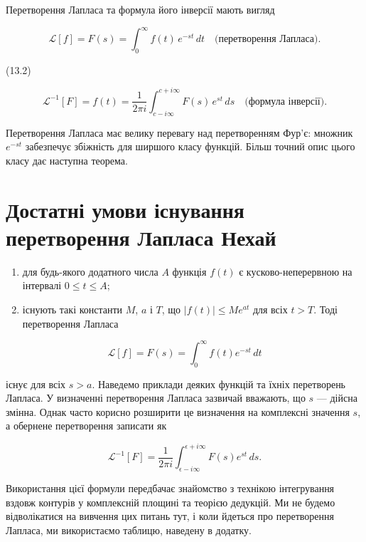 \documentclass[
  ukrainian,
]{article}
\providecommand{\tightlist}{%
  \setlength{\itemsep}{0pt}\setlength{\parskip}{0pt}}
\begin{document}
Перетворення Лапласа та формула його інверсії мають вигляд

\[
\mathscr{L}[f] = F(s) = \int_{0}^{\infty} f(t) \, e^{-st} \, dt
\quad \text{(перетворення Лапласа).}
\]

(13.2)

\[
\mathscr{L}^{-1}[F] = f(t) = \frac{1}{2\pi i} \int_{c-i\infty}^{c+i\infty} F(s) \, e^{st} \, ds
\quad \text{(формула інверсії).}
\]

Перетворення Лапласа має велику перевагу над перетворенням Фур'є:
множник \(e^{-st}\) забезпечує збіжність для ширшого класу функцій.
Більш точний опис цього класу дає наступна теорема.

\section{Достатні умови існування перетворення Лапласа
Нехай}\label{ux434ux43eux441ux442ux430ux442ux43dux456-ux443ux43cux43eux432ux438-ux456ux441ux43dux443ux432ux430ux43dux43dux44f-ux43fux435ux440ux435ux442ux432ux43eux440ux435ux43dux43dux44f-ux43bux430ux43fux43bux430ux441ux430-ux43dux435ux445ux430ux439}

\begin{enumerate}
\def\labelenumi{\arabic{enumi}.}
\tightlist
\item
  для будь-якого додатного числа \(A\) функція \(f(t)\) є
  кусково-неперервною на інтервалі \(0 \le t \le A\);
\item
  існують такі константи \(M\), \(a\) і \(T\), що \(|f(t)| \le Me^{at}\)
  для всіх \(t > T\). Тоді перетворення Лапласа
\end{enumerate}

\[
\mathscr{L}[f] = F(s) = \int_0^\infty f(t)e^{-st}\,dt
\]

існує для всіх \(s > a\). Наведемо приклади деяких функцій та їхніх
перетворень Лапласа. У визначенні перетворення Лапласа зазвичай
вважають, що \(s\) --- дійсна змінна. Однак часто корисно розширити це
визначення на комплексні значення \(s\), а обернене перетворення
записати як

\[
\mathscr{L}^{-1}[F] = \frac{1}{2\pi i} \int_{\epsilon - i\infty}^{\epsilon + i\infty} F(s)e^{st}\,ds.
\]

Використання цієї формули передбачає знайомство з технікою інтегрування
вздовж контурів у комплексній площині та теорією дедукцій. Ми не будемо
відволікатися на вивчення цих питань тут, і коли йдеться про
перетворення Лапласа, ми використаємо таблицю, наведену в додатку.
\end{document}
